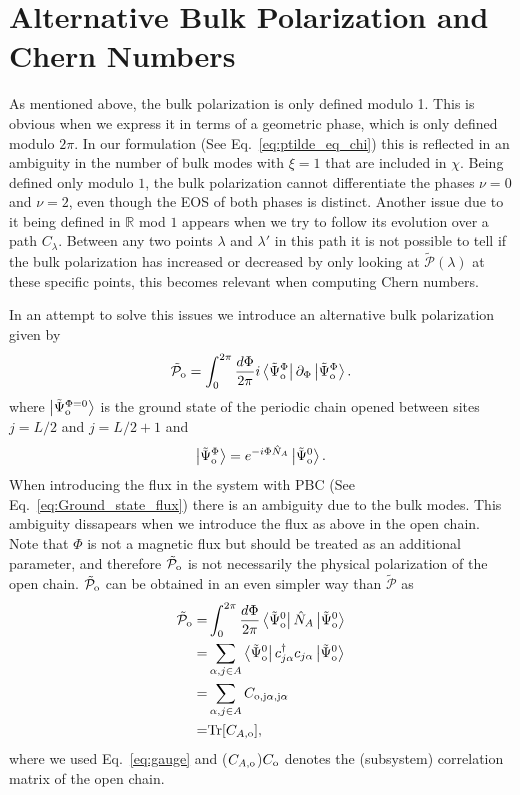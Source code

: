 \documentclass[twocolumn,amsmath,longbibliography,amssymb,superscriptaddress]{revtex4-1}
\newcommand{\tpo}{\tilde{\mathcal{P}}_{\rm o}}
\newcommand{\brapsio}[1]{\bra{\tilde{\Psi}_{{\rm o}}^#1}}
\newcommand{\ketpsio}[1]{\ket{\tilde{\Psi}_{{\rm o}}^#1}}
\begin{document}


\section{Alternative Bulk Polarization and Chern Numbers}

As mentioned above, the bulk polarization is only defined modulo 1. This is obvious when we express it in terms of a geometric phase, which is only defined modulo $2\pi$. In our formulation (See Eq.~\eqref{eq:ptilde_eq_chi}) this is reflected in an ambiguity in the number of bulk modes with $\xi = 1$ that are included in $\chi$. Being defined only modulo $1$, the bulk polarization cannot differentiate the phases $\nu=0$ and $\nu=2$, even though the EOS of both phases is distinct. Another issue due to it being defined in $\mathbb{R}$ mod $1$ appears when we try to follow its evolution over a path $C_\lambda$. Between any two points $\lambda$ and $\lambda'$ in this path it is not possible to tell if the bulk polarization has increased or decreased by only looking at $\tilde{\mathcal{P}}(\lambda)$ at these specific points, this becomes relevant when computing Chern numbers.

In an attempt to solve this issues we introduce an alternative bulk polarization given by
\begin{equation}\label{eq:tpo}
\tpo = \int_0^{2\pi}\frac{d\Phi}{2\pi} i\brapsio{\Phi}\partial_\Phi \ketpsio{\Phi}.
\end{equation}
where $\ketpsio{{\Phi=0}}$ is the ground state of the periodic chain opened between sites $j=L/2$ and $j=L/2+1$ and 
\begin{equation}
\ketpsio{\Phi} =e^{-i \Phi \hat{N}_A} \ketpsio{0}.
\label{eq:gauge}
\end{equation}
When introducing the flux in the system with PBC (See Eq.~\eqref{eq:Ground_state_flux}) there is an ambiguity due to the bulk modes. This ambiguity dissapears when we introduce the flux as above in the open chain. Note that $\Phi$ is not a magnetic flux but should be treated as an additional parameter, and therefore $\tpo$ is not necessarily the physical polarization of the open chain. $\tpo$ can be obtained in an even simpler way than $\tilde{\mathcal{P}}$ as 
\begin{align}\label{eq:phi_independence}
\tpo =&  \int_0^{2\pi}\frac{d\Phi}{2\pi} \brapsio{0} \hat{N}_A \ketpsio{0} \nonumber \\
=&\sum_{\alpha,j\in A}\brapsio{0} c_{j\alpha}^\dagger c_{j\alpha} \ketpsio{0} \nonumber\\
=&\sum_{\alpha,j\in A} C_{\rm o,j\alpha,j\alpha}\nonumber \\
=& {\rm Tr}[C_{A,\rm o}],
\end{align}
where we used Eq.~\eqref{eq:gauge} and ($C_{A,\rm o}$)$C_{\rm o}$ denotes the (subsystem) correlation matrix of the open chain.  
\end{document}
